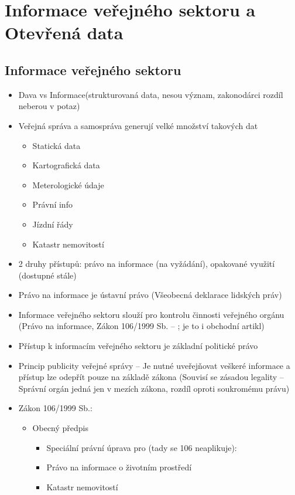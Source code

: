 \section{Informace veřejného sektoru a Otevřená data}
\subsection{Informace veřejného sektoru}
\begin{itemize}
    \item Dava vs Informace(strukturovaná data, nesou význam, zakonodárci rozdíl neberou v potaz)
    \item Veřejná správa a samospráva generují velké množství takových dat
    \begin{itemize}
        \item Statická data
        \item Kartografická data
        \item Meterologické údaje
        \item Právní info
        \item Jízdní řády
        \item Katastr nemovitostí
    \end{itemize}
    \item 2 druhy přístupů: právo na informace (na vyžádání), opakované využití (dostupné stále)
    \item Právo na informace je ústavní právo (Všeobecná deklarace lidských práv)
    \item Informace veřejného sektoru slouží pro kontrolu činnosti veřejného orgánu (Právo na
informace, Zákon 106/1999 Sb. – ; je to i obchodní artikl)
    \item Přístup k informacím veřejného sektoru je základní politické právo
    \item Princip publicity veřejné správy – Je nutné uveřejňovat veškeré informace a přístup lze
odepřít pouze na základě zákona (Souvisí se zásadou legality – Správní orgán jedná jen
v mezích zákona, rozdíl oproti soukromému právu)
\item Zákon 106/1999 Sb.:
\begin{itemize}
    \item Obecný předpis
    \begin{itemize}
        \item Speciální právní úprava pro (tady se 106 neaplikuje):
        \item Právo na informace o životním prostředí
        \item Katastr nemovitostí

\end{itemize}
\end{itemize}
\end{itemize}
